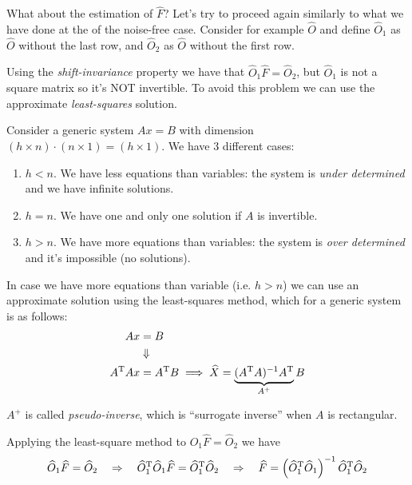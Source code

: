What about the estimation of $\hat{F}$? Let's try to proceed again similarly to what we have done at the  of the noise-free case.
Consider for example $\hat{O}$ and define $\hat{O}_1$ as $\hat{O}$ without the last row, and $\hat{O}_2$ as $\hat{O}$ without the first row.

Using the \emph{shift-invariance} property we have that $\hat{O}_1 \hat{F} = \hat{O}_2$, but $\hat{O}_1$ is not a square matrix so it's NOT invertible.
To avoid this problem we can use the approximate \emph{least-squares} solution.


\begin{remark}
    Consider a generic system $Ax = B$ with dimension  $(h\times n) \cdot (n \times 1) = (h \times 1)$. We have 3 different cases:
    \begin{enumerate}
        \item $h < n$. We have less equations than variables: the system is \emph{under determined} and we have infinite solutions.
        \item $h = n$. We have one and only one solution if $A$ is invertible.
        \item $h > n$. We have more equations than variables: the system is \emph{over determined} and it's impossible (no solutions).
    \end{enumerate}
\end{remark}

\begin{remark}
    In case we have more equations than variable (i.e. $h>n$) we can use an approximate solution using the least-squares method, which for a generic system is as follows:
    \begin{align*}
        Ax &= B \\
           &\Downarrow\\
        A^{\mathrm{T}} A x &= A^{\mathrm{T}} B \implies \widehat{X} = \underbrace{(A^{\mathrm{T}} A)^{-1}A^{\mathrm{T}}}_{A^+} B
    \end{align*}
    
    $A^+$ is called \emph{pseudo-inverse}, which is ``surrogate inverse'' when $A$ is rectangular.
\end{remark}


Applying the least-square method to $\hat{O}_1 \hat{F} = \hat{O}_2$ we have
\begin{align*}
    \widehat{O}_1\widehat{F} = \widehat{O}_2 \quad \Rightarrow \quad
    \widehat{O}_1^{\mathrm{T}}\widehat{O}_1\widehat{F} = \widehat{O}_1^{\mathrm{T}}\widehat{O}_2 \quad \Rightarrow \quad 
    \widehat{F} = \left(\widehat{O}_1^{\mathrm{T}}\widehat{O}_1\right)^{-1} \widehat{O}_1^{\mathrm{T}}\widehat{O}_2
\end{align*}


